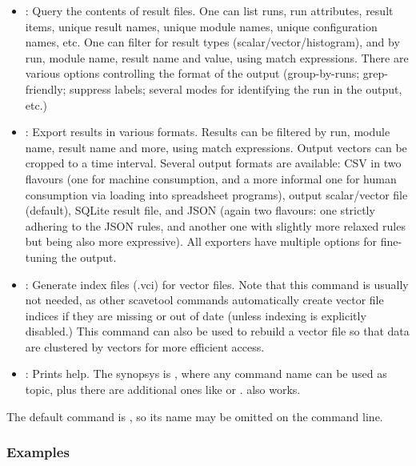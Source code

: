 \begin{itemize}

\item {}: Query the contents of result files. One can list
    runs, run attributes, result items, unique result names, unique module
    names, unique configuration names, etc. One can filter for result types
    (scalar/vector/histogram), and by run, module name, result name and value,
    using match expressions. There are various options controlling the format
    of the output (group-by-runs; grep-friendly; suppress labels; several
    modes for identifying the run in the output, etc.)

\item {}: Export results in various formats. Results can be filtered
    by run, module name, result name and more, using match expressions. Output
    vectors can be cropped to a time interval. Several output formats are
    available: CSV in two flavours (one for machine consumption, and a more
    informal one for human consumption via loading into spreadsheet programs),
    {\opp} output scalar/vector file (default), {\opp} SQLite result file, and
    JSON (again two flavours: one strictly adhering to the JSON rules, and
    another one with slightly more relaxed rules but being also more
    expressive). All exporters have multiple options for fine-tuning the output.

\item {}: Generate index files (.vci) for vector files. Note that this
    command is usually not needed, as other scavetool commands automatically create
    vector file indices if they are missing or out of date (unless indexing is
    explicitly disabled.) This command can also be used to rebuild a vector file
    so that data are clustered by vectors for more efficient access.

\item {}: Prints help. The synopsys is ,
    where any command name can be used as topic, plus there are
    additional ones like  or .  also works.

\end{itemize}

The default command is , so its name may be omitted on the
command line.


\subsubsection{Examples}
\label{sec:ana-sim:scavetool:examples}

